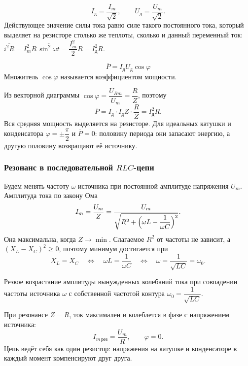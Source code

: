 \documentclass[12pt]{article}
\begin{document}
	\begin{definition}
		\[
			I_\text{д} = \dfrac{I_m}{\sqrt{2}}, \qquad U_\text{д} = \dfrac{U_m}{\sqrt{2}}.
		\]
		Действующее значение силы тока равно силе такого постоянного тока, который выделяет на резисторе столько же теплоты, сколько и данный переменный ток: $\overline{i^2 R} = I_m^2 R \, \overline{\sin^2 \omega t} = \dfrac{I_m^2}{2} R = I_\text{д}^2 R$.
	\end{definition}
	
	\begin{statement}
		\[
			\boxed{\overline{P} = I_\text{д} U_\text{д} \cos \varphi}
		\]
		Множитель $\cos \varphi$ называется коэффициентом мощности.
	\end{statement}
	
	\begin{note}
		Из векторной диаграммы $\cos \varphi = \dfrac{U_{Rm}}{U_m} = \dfrac{R}{Z}$, поэтому
		\[
			\overline{P} = I_\text{д} \cdot I_\text{д} Z \cdot \dfrac{R}{Z} = I_\text{д}^2 R.
		\]
		Вся средняя мощность выделяется на резисторе. Для идеальных катушки и конденсатора $\varphi = \pm \dfrac{\pi}{2}$ и $\overline{P} = 0$: половину периода они запасают энергию, а другую половину возвращают её источнику.
	\end{note}

	\subsubsection{Резонанс в последовательной $RLC$-цепи}
	
	Будем менять частоту $\omega$ источника при постоянной амплитуде напряжения $U_m$. Амплитуда тока по закону Ома
	\[
		I_m = \dfrac{U_m}{Z} = \dfrac{U_m}{\sqrt{R^2 + \Bigl( \omega L - \dfrac{1}{\omega C} \Bigr)^2}}.
	\]
	Она максимальна, когда $Z \to \min$. Слагаемое $R^2$ от частоты не зависит, а $(X_L - X_C)^2 \geqslant 0$, поэтому минимум достигается при
	\[
		X_L = X_C \quad \Longleftrightarrow \quad \omega L = \dfrac{1}{\omega C} \quad \Longleftrightarrow \quad \omega = \dfrac{1}{\sqrt{LC}} = \omega_0.
	\]
	
	\begin{definition}[Резонанс]
		Резкое возрастание амплитуды вынужденных колебаний тока при совпадении частоты источника $\omega$ с собственной частотой контура $\omega_0 = \dfrac{1}{\sqrt{LC}}$.
	\end{definition}
	
	\begin{statement}
		При резонансе $Z = R$, ток максимален и колеблется в фазе с напряжением источника:
		\[
			I_{m\,\text{рез}} = \dfrac{U_m}{R}, \qquad \varphi = 0.
		\]
		Цепь ведёт себя как один резистор: напряжения на катушке и конденсаторе в каждый момент компенсируют друг друга.
	\end{statement}
	
\end{document}

